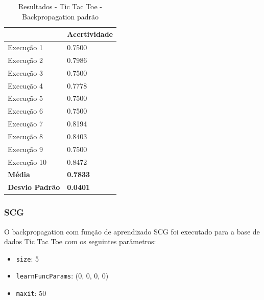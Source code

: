 \begin{table}[h!]
\centering
\caption{Resultados - Tic Tac Toe - Backpropagation padrão}
\label{tabela-resultado-tic-tac-toe-backpropagation-padrao}
\begin{tabular}{ll}
\toprule
                       & \textbf{Acertividade}       \\ \midrule
Execução 1             & 0.7500          \\
Execução 2             & 0.7986          \\
Execução 3             & 0.7500          \\
Execução 4             & 0.7778           \\
Execução 5             & 0.7500          \\
Execução 6             & 0.7500           \\
Execução 7             & 0.8194           \\
Execução 8             & 0.8403          \\
Execução 9             & 0.7500           \\
Execução 10            & 0.8472           \\
\textbf{Média}         & \textbf{0.7833} \\ \bottomrule
\textbf{Desvio Padrão} & \textbf{0.0401}
\end{tabular}
\end{table}

%

\subsubsection{SCG}

O backpropagation com função de aprendizado SCG foi executado para a base de dados Tic Tac Toe com os seguintes parâmetros:

\begin{itemize}
	\item \texttt{size}: 5
	\item \texttt{learnFuncParams}: (0, 0, 0, 0)
	\item \texttt{maxit}: 50
\end{itemize}

